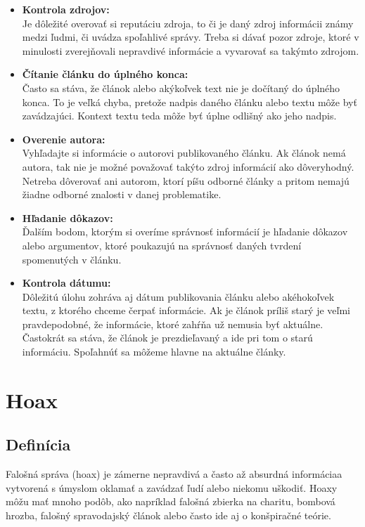 \documentclass[10pt,twoside,slovak,a4paper]{article}
\begin{document}
\begin{itemize}
    \item \textbf{Kontrola zdrojov:\\}
    Je dôležité overovať si reputáciu zdroja, to či je daný zdroj informácii známy medzi ľudmi, či uvádza spoľahlivé správy. Treba si dávať pozor zdroje, ktoré v minulosti zverejňovali nepravdivé informácie a vyvarovať sa takýmto zdrojom.
    
    \item \textbf{Čítanie článku do úplného konca:\\}
    Často sa stáva, že článok alebo akýkoľvek text nie je dočítaný do úplného konca. To je veľká chyba, pretože nadpis daného článku alebo textu môže byť zavádzajúci. Kontext textu teda môže byť úplne odlišný ako jeho nadpis.
    
    \item \textbf{Overenie autora:\\}
    Vyhľadajte si informácie o autorovi publikovaného článku. Ak článok nemá autora, tak nie je možné považovať takýto zdroj informácií ako dôveryhodný. Netreba dôverovať ani autorom, ktorí píšu odborné články a pritom nemajú žiadne odborné znalosti v danej problematike.

    \item \textbf{Hľadanie dôkazov:\\}
    Ďalším bodom, ktorým si overíme správnosť informácií je hľadanie dôkazov alebo argumentov, ktoré poukazujú na správnosť daných tvrdení spomenutých v článku.

    \item \textbf{Kontrola dátumu:\\}
    Dôležitú úlohu zohráva aj dátum publikovania článku alebo akéhokoľvek textu, z ktorého chceme čerpať informácie. Ak je článok príliš starý je veľmi pravdepodobné, že informácie, ktoré zahŕňa už nemusia byť aktuálne. Častokrát sa stáva, že článok je prezdieľavaný a ide pri tom o starú informáciu. Spoľahnúť sa môžeme hlavne na aktuálne články.
\end{itemize}

\section{Hoax} \label{hoax}
\subsection{Definícia} 
Falošná správa (hoax) je zámerne nepravdivá a často až absurdná informáciaa vytvorená s úmyslom oklamať a zavádzať ľudí alebo niekomu uškodiť. Hoaxy môžu mať mnoho podôb, ako napríklad falošná zbierka na charitu, bombová hrozba, falošný spravodajský článok alebo často ide aj o konšpiračné teórie. \cite{irena2020fake} \cite{mcgonagle2017fake}
\end{document}
